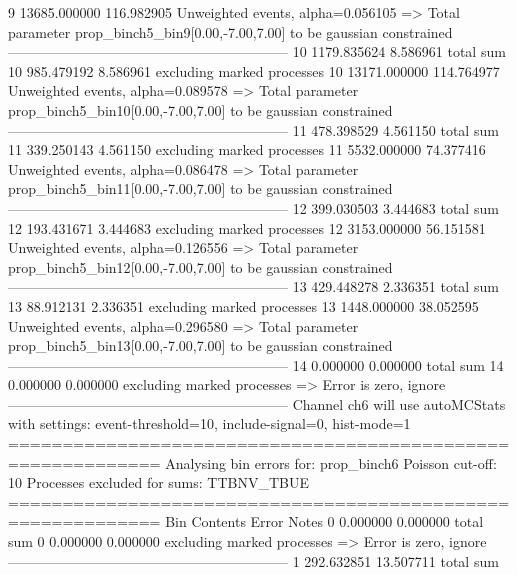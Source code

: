 9          13685.000000    116.982905      Unweighted events, alpha=0.056105
  => Total parameter prop_binch5_bin9[0.00,-7.00,7.00] to be gaussian constrained
------------------------------------------------------------
10         1179.835624     8.586961        total sum                     
10         985.479192      8.586961        excluding marked processes    
10         13171.000000    114.764977      Unweighted events, alpha=0.089578
  => Total parameter prop_binch5_bin10[0.00,-7.00,7.00] to be gaussian constrained
------------------------------------------------------------
11         478.398529      4.561150        total sum                     
11         339.250143      4.561150        excluding marked processes    
11         5532.000000     74.377416       Unweighted events, alpha=0.086478
  => Total parameter prop_binch5_bin11[0.00,-7.00,7.00] to be gaussian constrained
------------------------------------------------------------
12         399.030503      3.444683        total sum                     
12         193.431671      3.444683        excluding marked processes    
12         3153.000000     56.151581       Unweighted events, alpha=0.126556
  => Total parameter prop_binch5_bin12[0.00,-7.00,7.00] to be gaussian constrained
------------------------------------------------------------
13         429.448278      2.336351        total sum                     
13         88.912131       2.336351        excluding marked processes    
13         1448.000000     38.052595       Unweighted events, alpha=0.296580
  => Total parameter prop_binch5_bin13[0.00,-7.00,7.00] to be gaussian constrained
------------------------------------------------------------
14         0.000000        0.000000        total sum                     
14         0.000000        0.000000        excluding marked processes    
  => Error is zero, ignore      
------------------------------------------------------------
Channel ch6 will use autoMCStats with settings: event-threshold=10, include-signal=0, hist-mode=1
============================================================
Analysing bin errors for: prop_binch6
Poisson cut-off: 10
Processes excluded for sums: TTBNV_TBUE
============================================================
Bin        Contents        Error           Notes                         
0          0.000000        0.000000        total sum                     
0          0.000000        0.000000        excluding marked processes    
  => Error is zero, ignore      
------------------------------------------------------------
1          292.632851      13.507711       total sum                     
